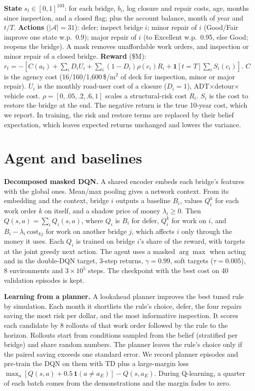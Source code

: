 \documentclass[conference,10pt]{IEEEtran}
\begin{document}
\textbf{State} $s_t\in[0,1]^{103}$: for each bridge, $b_i$, log closure and repair costs, age, months
since inspection, and a closed flag; plus the account balance, month of year and $t/T$.
\textbf{Actions} ($|\mathcal{A}|{=}31$): defer; inspect bridge $i$; minor repair of $i$ (Good/Fair
improve one state w.p.\ 0.9); major repair of $i$ (to Excellent w.p.\ 0.95, else Good; reopens the
bridge). A mask removes unaffordable work orders, and inspection or minor repair of a closed bridge.
\textbf{Reward} (\$M):
$r_t{=}-[C(a_t)+\sum_i D_iU_i+\sum_i(1{-}D_i)\rho(c_i)R_i+\mathbf{1}[t{=}T]\sum_i S_i(c_i)]$.
$C$ is the agency cost (16/160/1{,}600\,\$/m$^2$ of deck for inspection, minor or major repair). $U_i$
is the monthly road-user cost of a closure ($D_i{=}1$), ADT$\times$detour$\times$vehicle cost.
$\rho{=}[0,.05,.2,.6,1]$ scales a structural-risk cost $R_i$. $S_i$ is the cost to restore the bridge
at the end. The negative return is the true 10-year cost, which we report. In training, the risk and
restore terms are replaced by their belief expectation, which leaves expected returns unchanged and
lowers the variance.

\section{Agent and baselines}
\textbf{Decomposed masked DQN.} A shared encoder embeds each bridge's features with the global ones.
Mean/max pooling gives a network context. From its embedding and the context, bridge $i$ outputs a
baseline $B_i$, values $Q_i^k$ for each work order $k$ on itself, and a shadow price of money
$\lambda_i{\ge}0$. Then $Q(s,a){=}\sum_iQ_i(s,a)$, where $Q_i$ is $B_i$ for defer, $Q_i^k$ for
work on $i$, and $B_i-\lambda_i\,\mathrm{cost}_{kj}$ for work on another bridge $j$, which affects $i$
only through the money it uses. Each $Q_i$ is trained on bridge $i$'s share of the reward, with
targets at the joint greedy next action. The agent uses a masked $\arg\max$ when acting and in the
double-DQN target, 3-step returns, $\gamma{=}0.99$, soft targets ($\tau{=}0.005$), 8 environments and
$3{\times}10^5$ steps. The checkpoint with the best cost on 40 validation episodes is kept.

\textbf{Learning from a planner.} A lookahead planner improves the best tuned rule by simulation. Each
month it shortlists the rule's choice, defer, the four repairs saving the most risk per dollar, and the
most informative inspection. It scores each candidate by 8 rollouts of that work order followed by the
rule to the horizon. Rollouts start from conditions sampled from the belief (stratified per bridge) and
share random numbers. The planner leaves the rule's choice only if the paired saving exceeds one
standard error. We record \DemoEpisodes{} planner episodes and pre-train the DQN on them
with TD plus a large-margin loss $\max_a[Q(s,a){+}0.5\,\mathbf{1}(a{\ne}a_E)]-Q(s,a_E)$. During
Q-learning, a quarter of each batch comes from the demonstrations and the margin fades to zero.
\end{document}
